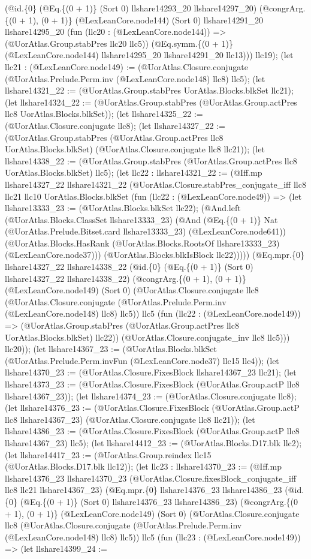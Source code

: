 \documentclass[11pt]{article}
\begin{document}
(@id.\{0\} (@Eq.\{(0 + 1)\} (Sort 0) llshare14293\_20 llshare14297\_20) (@congrArg.\{(0 + 1), (0 + 1)\} (@LexLeanCore.node144) (Sort 0) llshare14291\_20 llshare14295\_20 (fun (llc20 : (@LexLeanCore.node144)) => (@UorAtlas.Group.stabPres llc20 llc5)) (@Eq.symm.\{(0 + 1)\} (@LexLeanCore.node144) llshare14295\_20 llshare14291\_20 llc13))) llc19); (let llc21 : (@LexLeanCore.node149) := (@UorAtlas.Closure.conjugate (@UorAtlas.Prelude.Perm.inv (@LexLeanCore.node148) llc8) llc5); (let llshare14321\_22 := (@UorAtlas.Group.stabPres UorAtlas.Blocks.blkSet llc21); (let llshare14324\_22 := (@UorAtlas.Group.stabPres (@UorAtlas.Group.actPres llc8 UorAtlas.Blocks.blkSet)); (let llshare14325\_22 := (@UorAtlas.Closure.conjugate llc8); (let llshare14327\_22 := (@UorAtlas.Group.stabPres (@UorAtlas.Group.actPres llc8 UorAtlas.Blocks.blkSet) (@UorAtlas.Closure.conjugate llc8 llc21)); (let llshare14338\_22 := (@UorAtlas.Group.stabPres (@UorAtlas.Group.actPres llc8 UorAtlas.Blocks.blkSet) llc5); (let llc22 : llshare14321\_22 := (@Iff.mp llshare14327\_22 llshare14321\_22 (@UorAtlas.Closure.stabPres\_conjugate\_iff llc8 llc21 llc10 UorAtlas.Blocks.blkSet (fun (llc22 : (@LexLeanCore.node49)) => (let llshare13333\_23 := (@UorAtlas.Blocks.blkSet llc22); (@And.left (@UorAtlas.Blocks.ClassSet llshare13333\_23) (@And (@Eq.\{(0 + 1)\} Nat (@UorAtlas.Prelude.Bitset.card llshare13333\_23) (@LexLeanCore.node641)) (@UorAtlas.Blocks.HasRank (@UorAtlas.Blocks.RootsOf llshare13333\_23) (@LexLeanCore.node37))) (@UorAtlas.Blocks.blkIsBlock llc22))))) (@Eq.mpr.\{0\} llshare14327\_22 llshare14338\_22 (@id.\{0\} (@Eq.\{(0 + 1)\} (Sort 0) llshare14327\_22 llshare14338\_22) (@congrArg.\{(0 + 1), (0 + 1)\} (@LexLeanCore.node149) (Sort 0) (@UorAtlas.Closure.conjugate llc8 (@UorAtlas.Closure.conjugate (@UorAtlas.Prelude.Perm.inv (@LexLeanCore.node148) llc8) llc5)) llc5 (fun (llc22 : (@LexLeanCore.node149)) => (@UorAtlas.Group.stabPres (@UorAtlas.Group.actPres llc8 UorAtlas.Blocks.blkSet) llc22)) (@UorAtlas.Closure.conjugate\_inv llc8 llc5))) llc20)); (let llshare14367\_23 := (@UorAtlas.Blocks.blkSet (@UorAtlas.Prelude.Perm.invFun (@LexLeanCore.node37) llc15 llc4)); (let llshare14370\_23 := (@UorAtlas.Closure.FixesBlock llshare14367\_23 llc21); (let llshare14373\_23 := (@UorAtlas.Closure.FixesBlock (@UorAtlas.Group.actP llc8 llshare14367\_23)); (let llshare14374\_23 := (@UorAtlas.Closure.conjugate llc8); (let llshare14376\_23 := (@UorAtlas.Closure.FixesBlock (@UorAtlas.Group.actP llc8 llshare14367\_23) (@UorAtlas.Closure.conjugate llc8 llc21)); (let llshare14386\_23 := (@UorAtlas.Closure.FixesBlock (@UorAtlas.Group.actP llc8 llshare14367\_23) llc5); (let llshare14412\_23 := (@UorAtlas.Blocks.D17.blk llc2); (let llshare14417\_23 := (@UorAtlas.Group.reindex llc15 (@UorAtlas.Blocks.D17.blk llc12)); (let llc23 : llshare14370\_23 := (@Iff.mp llshare14376\_23 llshare14370\_23 (@UorAtlas.Closure.fixesBlock\_conjugate\_iff llc8 llc21 llshare14367\_23) (@Eq.mpr.\{0\} llshare14376\_23 llshare14386\_23 (@id.\{0\} (@Eq.\{(0 + 1)\} (Sort 0) llshare14376\_23 llshare14386\_23) (@congrArg.\{(0 + 1), (0 + 1)\} (@LexLeanCore.node149) (Sort 0) (@UorAtlas.Closure.conjugate llc8 (@UorAtlas.Closure.conjugate (@UorAtlas.Prelude.Perm.inv (@LexLeanCore.node148) llc8) llc5)) llc5 (fun (llc23 : (@LexLeanCore.node149)) => (let llshare14399\_24 := 
\end{document}
